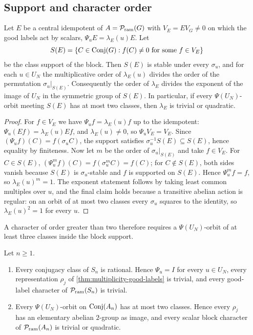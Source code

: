 \subsection{Support and character order}

\begin{lemma}
\label{lem:orbit-exponent-bound}
Let \(E\) be a central idempotent of \(A=\mathcal P_{\mathrm{ram}}(G)\) with \(V_E=EV_G\neq0\)
on which the good labels act by scalars,
\(\Psi_uE=\lambda_E(u)E\).  Let
\[
 S(E)=\{C\in\Conj(G):f(C)\neq0\ \text{for some}\ f\in V_E\}
\]
be the class support of the block.  Then \(S(E)\) is stable under every
\(\sigma_u\), and for each \(u\in U_N\) the multiplicative order of
\(\lambda_E(u)\) divides the order of the permutation
\(\sigma_u|_{S(E)}\).  Consequently the order of \(\lambda_E\) divides the
exponent of the image of \(U_N\) in the symmetric group of \(S(E)\).  In
particular, if every \(\Psi(U_N)\)-orbit meeting \(S(E)\) has at most two
classes, then \(\lambda_E\) is trivial or quadratic.
\end{lemma}

\begin{proof}
For \(f\in V_E\) we have \(\Psi_uf=\lambda_E(u)f\) up to the idempotent:
\(\Psi_u(Ef)=\lambda_E(u)Ef\), and \(\lambda_E(u)\neq0\), so
\(\Psi_uV_E=V_E\).  Since \((\Psi_uf)(C)=f(\sigma_uC)\), the support
satisfies \(\sigma_u^{-1}S(E)\subseteq S(E)\), hence equality by
finiteness.  Now let \(m\) be the order of \(\sigma_u|_{S(E)}\) and take
\(f\in V_E\).  For \(C\in S(E)\),
\((\Psi_u^mf)(C)=f(\sigma_u^mC)=f(C)\); for \(C\notin S(E)\), both sides
vanish because \(S(E)\) is \(\sigma_u\)-stable and \(f\) is supported on
\(S(E)\).  Hence \(\Psi_u^mf=f\), so \(\lambda_E(u)^m=1\).  The exponent
statement follows by taking least common multiples over \(u\), and the
final claim holds because a transitive abelian action is regular: on an
orbit of at most two classes every \(\sigma_u\) squares to the identity,
so \(\lambda_E(u)^2=1\) for every \(u\).
\end{proof}

A character of order greater than two therefore requires a
\(\Psi(U_N)\)-orbit of at least three classes inside the block support.

\begin{proposition}
\label{prop:classical-series}
Let \(n\geq1\).
\begin{enumerate}
\item Every conjugacy class of \(S_n\) is rational.  Hence \(\Psi_u=I\) for
every \(u\in U_N\), every representation \(\rho_j\) of
\cref{thm:multiplicity-good-labels} is trivial, and every good-label
character of \(\mathcal P_{\mathrm{ram}}(S_n)\) is trivial.
\item Every \(\Psi(U_N)\)-orbit on \(\operatorname{Conj}(A_n)\) has at most two classes.
Hence every \(\rho_j\) has an elementary abelian \(2\)-group as image, and
every scalar block character of \(\mathcal P_{\mathrm{ram}}(A_n)\) is trivial or quadratic.
\end{enumerate}
\end{proposition}

